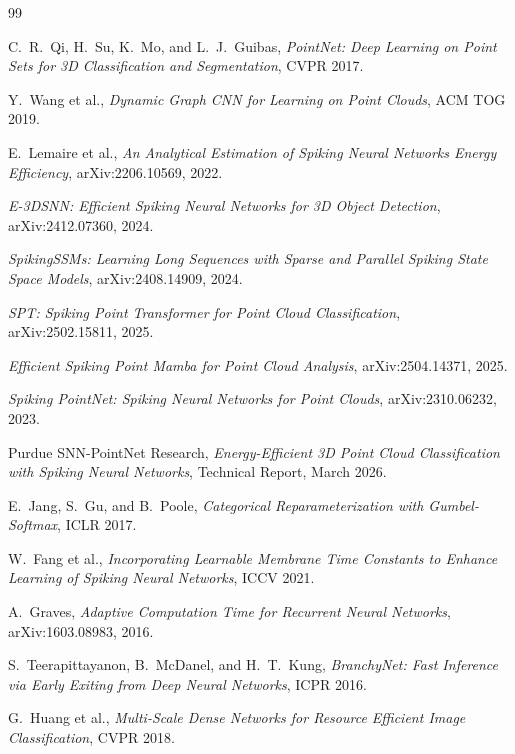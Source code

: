 \documentclass[11pt,a4paper]{article}
\begin{document}
\begin{thebibliography}{99}

C.~R.~Qi, H.~Su, K.~Mo, and L.~J.~Guibas,
\textit{PointNet: Deep Learning on Point Sets for 3D Classification and Segmentation},
CVPR 2017.

Y.~Wang et al.,
\textit{Dynamic Graph CNN for Learning on Point Clouds},
ACM TOG 2019.

E.~Lemaire et al.,
\textit{An Analytical Estimation of Spiking Neural Networks Energy Efficiency},
arXiv:2206.10569, 2022.

\textit{E-3DSNN: Efficient Spiking Neural Networks for 3D Object Detection},
arXiv:2412.07360, 2024.

\textit{SpikingSSMs: Learning Long Sequences with Sparse and Parallel Spiking State Space Models},
arXiv:2408.14909, 2024.

\textit{SPT: Spiking Point Transformer for Point Cloud Classification},
arXiv:2502.15811, 2025.

\textit{Efficient Spiking Point Mamba for Point Cloud Analysis},
arXiv:2504.14371, 2025.

\textit{Spiking PointNet: Spiking Neural Networks for Point Clouds},
arXiv:2310.06232, 2023.

Purdue SNN-PointNet Research,
\textit{Energy-Efficient 3D Point Cloud Classification with Spiking Neural Networks},
Technical Report, March 2026.

E.~Jang, S.~Gu, and B.~Poole,
\textit{Categorical Reparameterization with Gumbel-Softmax},
ICLR 2017.

W.~Fang et al.,
\textit{Incorporating Learnable Membrane Time Constants to Enhance Learning of Spiking Neural Networks},
ICCV 2021.

A.~Graves,
\textit{Adaptive Computation Time for Recurrent Neural Networks},
arXiv:1603.08983, 2016.

S.~Teerapittayanon, B.~McDanel, and H.~T.~Kung,
\textit{BranchyNet: Fast Inference via Early Exiting from Deep Neural Networks},
ICPR 2016.

G.~Huang et al.,
\textit{Multi-Scale Dense Networks for Resource Efficient Image Classification},
CVPR 2018.


\end{thebibliography}
\end{document}
